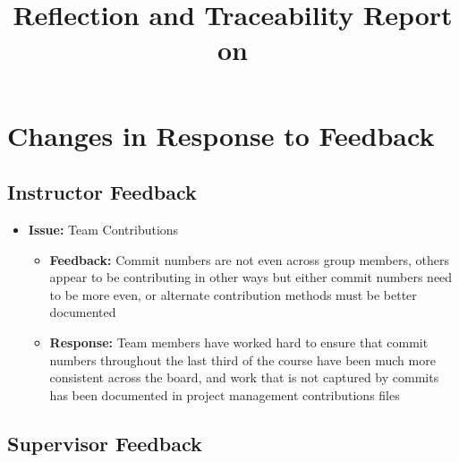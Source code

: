 \documentclass{article}
\title{Reflection and Traceability Report on \progname}
\author{\authname}
\date{}
\begin{document}
\maketitle

\section{Changes in Response to Feedback}

\subsection{Instructor Feedback}

\begin{itemize}
    \item \textbf{Issue:} Team Contributions
    \begin{itemize}
        \item \textbf{Feedback:} Commit numbers are not even across group members, others appear to be contributing in other ways but either commit numbers need to be more even, or alternate contribution methods must be better documented
        \item \textbf{Response:} Team members have worked hard to ensure that commit numbers throughout the last third of the course have been much more consistent across the board, and work that is not captured by commits has been documented in project management contributions files
    \end{itemize}
\end{itemize}

\subsection{Supervisor Feedback}
\end{document}
